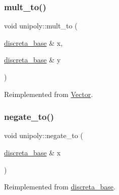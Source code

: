 \mbox{\label{classunipoly_a95bf7f347a5630f0d3f9737ffe22a341}} 
\subsubsection{\texorpdfstring{mult\+\_\+to()}{mult\_to()}}
{\footnotesize\ttfamily void unipoly\+::mult\+\_\+to (\begin{DoxyParamCaption}\item[{\mbox{\hyperlink{classdiscreta__base}{discreta\+\_\+base}} \&}]{x,  }\item[{\mbox{\hyperlink{classdiscreta__base}{discreta\+\_\+base}} \&}]{y }\end{DoxyParamCaption})\hspace{0.3cm}{\ttfamily [virtual]}}



Reimplemented from \mbox{\hyperlink{class_vector_a77dd4ded54124a6f928c411dc0960a73}{Vector}}.

\mbox{\label{classunipoly_a2181196b44786790f58b72510620db97}} 
\subsubsection{\texorpdfstring{negate\+\_\+to()}{negate\_to()}}
{\footnotesize\ttfamily void unipoly\+::negate\+\_\+to (\begin{DoxyParamCaption}\item[{\mbox{\hyperlink{classdiscreta__base}{discreta\+\_\+base}} \&}]{x }\end{DoxyParamCaption})\hspace{0.3cm}{\ttfamily [virtual]}}



Reimplemented from \mbox{\hyperlink{classdiscreta__base_a65ad2034f2f4518d424b814974018a03}{discreta\+\_\+base}}.

\mbox{\label{classunipoly_a1c187a11d98570cb22ccf0ee2a06345e}} 
